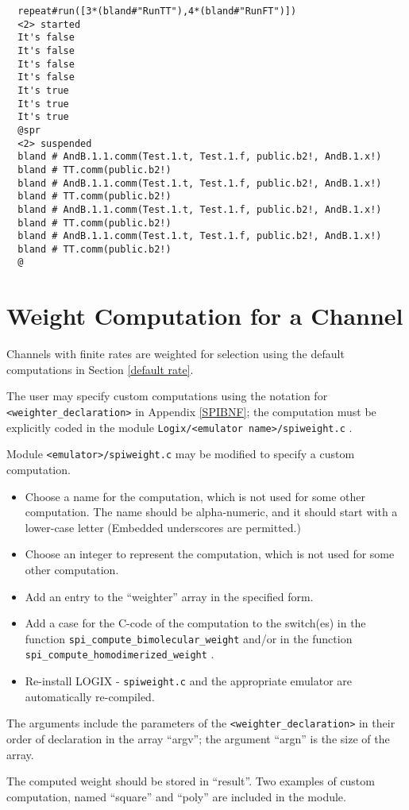 \begin{verbatim}
  repeat#run([3*(bland#"RunTT"),4*(bland#"RunFT")]) 
  <2> started
  It's false
  It's false
  It's false
  It's false
  It's true
  It's true
  It's true
  @spr
  <2> suspended
  bland # AndB.1.1.comm(Test.1.t, Test.1.f, public.b2!, AndB.1.x!)
  bland # TT.comm(public.b2!)
  bland # AndB.1.1.comm(Test.1.t, Test.1.f, public.b2!, AndB.1.x!)
  bland # TT.comm(public.b2!)
  bland # AndB.1.1.comm(Test.1.t, Test.1.f, public.b2!, AndB.1.x!)
  bland # TT.comm(public.b2!)
  bland # AndB.1.1.comm(Test.1.t, Test.1.f, public.b2!, AndB.1.x!)
  bland # TT.comm(public.b2!)
  @
\end{verbatim}

\section{Weight Computation for a Channel}
Channels with finite rates are weighted for selection using the
default computations in Section \ref{default rate}.

\noindent
The user may specify custom computations using the notation for\linebreak
\verb+<weighter_declaration>+
in Appendix \ref{SPIBNF}; the computation must be explicitly coded in
the module \verb+Logix/<emulator name>/spiweight.c+ .

\noindent
Module \verb+<emulator>/spiweight.c+ may be modified to
specify a custom computation.

\begin{itemize}
\item Choose a name for the computation, which is not used for some
other computation.  The name should be
alpha-numeric, and it should start with a lower-case letter (Embedded
underscores are permitted.)
\item Choose an integer to represent the computation, which is not used for
some other computation.
\item Add an entry to the ``weighter'' array in the specified form.
\item Add a case for the C-code of the computation to the switch(es)
in the function
\verb+spi_compute_bimolecular_weight+ and/or in the function
\verb+spi_compute_homodimerized_weight+ .
\item Re-install LOGIX - \verb+spiweight.c+ and the
appropriate emulator are automatically re-compiled.
\end{itemize}

\noindent
The arguments include the parameters of the
\verb+<weighter_declaration>+ in their order of declaration in
the array ``argv''; the argument ``argn'' is the size of the
array.

\noindent
The computed weight should be stored in ``result''.  Two
examples of custom computation, named ``square'' and ``poly''
are included in the module.

\newpage





